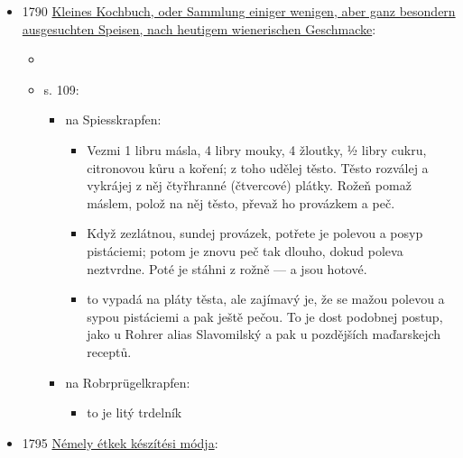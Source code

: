 \begin{itemize}
  \begin{itemize}
  \tightlist
  \item
  \item
    s. 509, recept 797, Spiesskuchen:

    \begin{itemize}
    \tightlist
    \item
      je to  na litý trdelník
    \end{itemize}
  \end{itemize}
\item
  1790
  \href{https://www.digital.wienbibliothek.at/wbrobv/content/titleinfo/3327128?query=kochbuch}{Kleines
  Kochbuch, oder Sammlung einiger wenigen, aber ganz besondern
  ausgesuchten Speisen, nach heutigem wienerischen Geschmacke}:

  \begin{itemize}
  \tightlist
  \item
     
  \item
    s. 109:

    \begin{itemize}
    \tightlist
    \item
       na Spiesskrapfen:

      \begin{itemize}
      \tightlist
      \item
        Vezmi 1 libru másla, 4 libry mouky, 4 žloutky, ½ libry cukru,
        citronovou kůru a koření; z toho udělej těsto. Těsto rozválej a
        vykrájej z něj čtyřhranné (čtvercové) plátky. Rožeň pomaž
        máslem, polož na něj těsto, převaž ho provázkem a peč.
      \item
        Když zezlátnou, sundej provázek, potřete je polevou a posyp
        pistáciemi; potom je znovu peč tak dlouho, dokud poleva
        neztvrdne. Poté je stáhni z rožně --- a jsou hotové.
      \item
        to vypadá na pláty těsta, ale zajímavý je, že se mažou polevou a
        sypou pistáciemi a pak ještě pečou. To je dost podobnej postup,
        jako u Rohrer alias Slavomilský a pak u pozdějších maďarskejch
        receptů.
      \end{itemize}
    \item
       na Robrprügelkrapfen:

      \begin{itemize}
      \tightlist
      \item
        to je litý trdelník
      \end{itemize}
    \end{itemize}
  \end{itemize}
\item
  1795
  \href{https://web.archive.org/web/20201229075645/http://www.kurtos.eu/dl/XVI_konyv.pdf}{Némely
  étkek készítési módja}:


\end{itemize}
